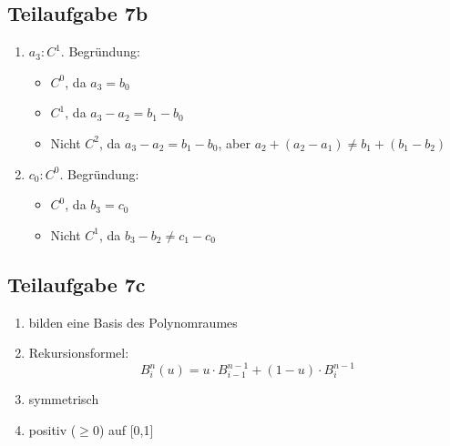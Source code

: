 \documentclass[a4paper]{scrartcl}
\begin{document}
\subsection*{Teilaufgabe 7b}

\begin{enumerate}[label=(\Roman*)]
    \item $a_3: C^1$. Begründung:
          \begin{itemize}
              \item $C^0$, da $a_3 = b_0$
              \item $C^1$, da $a_3 - a_2 = b_1 - b_0$
              \item Nicht $C^2$, da $a_3 - a_2 = b_1 - b_0$, aber $a_2 + (a_2-a_1) \neq b_1 + (b_1 - b_2)$
          \end{itemize}
    \item $c_0: C^0$. Begründung:
          \begin{itemize}
              \item $C^0$, da $b_3 = c_0$
              \item Nicht $C^1$, da $b_3-b_2 \neq c_1 - c_0$
          \end{itemize}
\end{enumerate}

\subsection*{Teilaufgabe 7c}
\begin{enumerate}
    \item bilden eine Basis des Polynomraumes
    \item Rekursionsformel: \[B^n_i(u) = u \cdot B^{n-1}_{i-1} + (1-u) \cdot B^{n-1}_{i} \]
    \item symmetrisch
    \item positiv ($\geq 0$) auf [0,1]
\end{enumerate}
\end{document}
